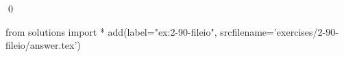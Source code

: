 
\begin{ex}
  \label{ex:2-90-fileio}
  
  \qed
\end{ex}
\begin{python0}
from solutions import *
add(label="ex:2-90-fileio",
    srcfilename='exercises/2-90-fileio/answer.tex')
\end{python0}
